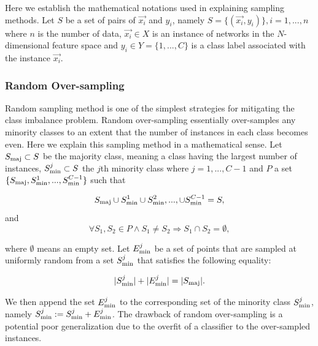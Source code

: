\documentclass{article}
\begin{document}
 Here we establish the mathematical notations used in explaining sampling methods. Let $S$ be a set of pairs of $\vec{x_i}$ and $y_i$, namely $S =\{(\vec{x_i},y_i)\}, i = 1,...,n$ where $n$ is the number of data, $\vec{x_i} \in X$ is an instance of networks in the $N$-dimensional feature space and $y_i \in Y = \{1,...,C\}$ is a class label associated with the instance $\vec{x_i}$.   


		\subsubsection{Random Over-sampling}
		Random sampling method is one of the simplest strategies for mitigating the class imbalance problem. Random over-sampling essentially over-samples any minority classes to an extent that the number of instances in each class becomes even. Here we explain this sampling method in a mathematical sense. Let $S_{\rm{maj}} \subset S$ be the majority class, meaning a class having the largest number of instances, $S_{\rm{min}}^{j} \subset S$ the $j$th minority class where $j = 1,...,C-1$ and $P$ a set $\{S_{\rm{maj}}, S_{\rm{min}}^{1},...,S_{\rm{min}}^{C-1} \}$ such that
	
	\begin{equation}
	S_{\rm{maj}} \cup S_{\rm{min}}^{1} \cup S_{\rm{min}}^{2},..., \cup S_{\rm{min}}^{C-1} = S,
	\end{equation}
	and
	\begin{equation}
	\forall S_1,S_2 \in P \land S_1 \neq S_2 \Rightarrow S_1 \cap S_2 = \emptyset,
	\end{equation}

	
where $\emptyset$ means an empty set. Let $E_{\rm{min}}^j$ be a set of points that are sampled at uniformly random from a set $S_{\rm{min}}^{j}$ that satisfies the following equality:

	\begin{equation}
	|S_{\rm{min}}^{j}| + | E_{\rm{min}}^j | = |S_{\rm{maj}}|.
	\end{equation}
	
 We then append the set $E_{\rm{min}}^j$ to the corresponding set of the minority class $S_{\rm{min}}^{j}$, namely $S_{\rm{min}}^{j} := S_{\rm{min}}^{j} + E_{\rm{min}}^j$. The drawback of random over-sampling is a potential poor generalization due to the overfit of a classifier to the over-sampled instances.
	
\end{document}

